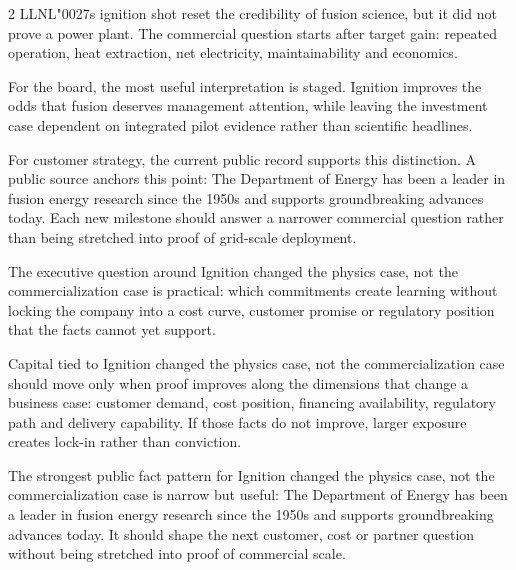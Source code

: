 \documentclass[10pt,a4paper]{article}
\newcommand{\BOApos}{{\BOQuoteFont\char"0027}}
\begin{document}
\begin{multicols}{2}
{\small LLNL\BOApos{}s ignition shot reset the credibility of fusion science, but it did not prove a power plant. The commercial question starts after target gain: repeated operation, heat extraction, net electricity, maintainability and economics.}\par
{\small For the board, the most useful interpretation is staged. Ignition improves the odds that fusion deserves management attention, while leaving the investment case dependent on integrated pilot evidence rather than scientific headlines.}\par
{\small For customer strategy, the current public record supports this distinction. A public source anchors this point: The Department of Energy has been a leader in fusion energy research since the 1950s and supports groundbreaking advances today. Each new milestone should answer a narrower commercial question rather than being stretched into proof of grid-scale deployment.}\par
{\small The executive question around Ignition changed the physics case, not the commercialization case is practical: which commitments create learning without locking the company into a cost curve, customer promise or regulatory position that the facts cannot yet support.}\par
{\small Capital tied to Ignition changed the physics case, not the commercialization case should move only when proof improves along the dimensions that change a business case: customer demand, cost position, financing availability, regulatory path and delivery capability. If those facts do not improve, larger exposure creates lock-in rather than conviction.}\par
{\small The strongest public fact pattern for Ignition changed the physics case, not the commercialization case is narrow but useful: The Department of Energy has been a leader in fusion energy research since the 1950s and supports groundbreaking advances today. It should shape the next customer, cost or partner question without being stretched into proof of commercial scale.}\par
\end{multicols}
\label{chap:4:end}
\end{document}
